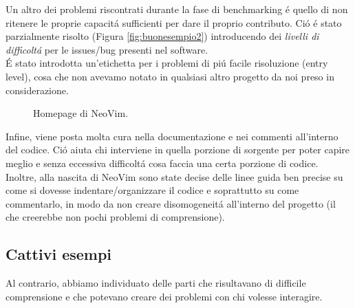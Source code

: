 \documentclass[12pt]{article} %
\begin{document}
Un altro dei problemi riscontrati durante la fase di benchmarking \'e quello di non ritenere le proprie capacit\'a sufficienti per dare il proprio contributo. Ci\'o \'e stato parzialmente risolto (Figura \ref{fig:buonesempio2}) introducendo dei \emph{livelli di difficolt\'a} per le issues/bug presenti nel software.\\
\'E stato introdotta un'etichetta per i problemi di pi\'u facile risoluzione (entry level), cosa che non avevamo notato in qualsiasi altro progetto da noi preso in considerazione.

\begin{figure}[H] 
\caption{Homepage di NeoVim.}
\label{fig:buonesempio3}
\end{figure}

Infine, viene posta molta cura nella documentazione e nei commenti all'interno del codice. Ci\'o aiuta chi interviene in quella porzione di sorgente per poter capire meglio e senza eccessiva difficolt\'a cosa faccia una certa porzione di codice.\\
Inoltre, alla nascita di NeoVim sono state decise delle linee guida ben precise su come si dovesse indentare/organizzare il codice e soprattutto su come commentarlo, in modo da non creare disomogeneit\'a all'interno del progetto (il che creerebbe non pochi problemi di comprensione).

\subsection{Cattivi esempi}
\label{badexamples}
Al contrario, abbiamo individuato delle parti che risultavano di difficile comprensione e che potevano creare dei problemi con chi volesse interagire.
\end{document}
